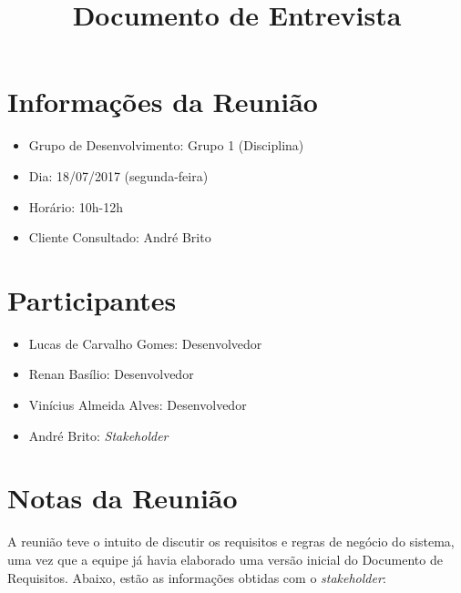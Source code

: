 \documentclass{article}
\title{Documento de Entrevista}
\begin{document}
\maketitle

\section{Informações da Reunião}

\begin{itemize}

	\item Grupo de Desenvolvimento: Grupo 1 (Disciplina)
	\item Dia: 18/07/2017 (segunda-feira)
    \item Horário: 10h-12h
    \item Cliente Consultado: André Brito

\end{itemize}

\section{Participantes}

\begin{itemize}

	\item Lucas de Carvalho Gomes: Desenvolvedor
    \item Renan Basílio: Desenvolvedor
    \item Vinícius Almeida Alves: Desenvolvedor
    \item André Brito: \textit{Stakeholder}

\end{itemize}

\section{Notas da Reunião}

A reunião teve o intuito de discutir os requisitos e regras de negócio do sistema, uma vez que a equipe já havia elaborado uma versão inicial do Documento de Requisitos. Abaixo, estão as informações obtidas com o \textit{stakeholder}:
\end{document}
